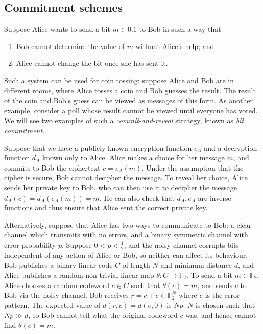 \subsection{Commitment schemes}
Suppose Alice wants to send a bit \( m \in \qty{0,1} \) to Bob in such a way that
\begin{enumerate}
    \item Bob cannot determine the value of \( m \) without Alice's help; and
    \item Alice cannot change the bit once she has sent it.
\end{enumerate}
Such a system can be used for coin tossing: suppose Alice and Bob are in different rooms, where Alice tosses a coin and Bob guesses the result.
The result of the coin and Bob's guess can be viewed as messages of this form.
As another example, consider a poll whose result cannot be viewed until everyone has voted.
We will see two examples of such a \emph{commit-and-reveal} strategy, known as \emph{bit commitment}.

Suppose that we have a publicly known encryption function \( e_A \) and a decryption function \( d_A \) known only to Alice.
Alice makes a choice for her message \( m \), and commits to Bob the ciphertext \( c = e_A(m) \).
Under the assumption that the cipher is secure, Bob cannot decipher the message.
To reveal her choice, Alice sends her private key to Bob, who can then use it to decipher the message \( d_A(c) = d_A(e_A(m)) = m \).
He can also check that \( d_A, e_A \) are inverse functions and thus ensure that Alice sent the correct private key.

Alternatively, suppose that Alice has two ways to communicate to Bob: a clear channel which transmits with no errors, and a binary symmetric channel with error probability \( p \).
Suppose \( 0 < p < \frac{1}{2} \), and the noisy channel corrupts bits independent of any action of Alice or Bob, so neither can affect its behaviour.
Bob publishes a binary linear code \( C \) of length \( N \) and minimum distance \( d \), and Alice publishes a random non-trivial linear map \( \theta \colon C \to \mathbb F_2 \).
To send a bit \( m \in \mathbb F_2 \), Alice chooses a random codeword \( c \in C \) such that \( \theta(c) = m \), and sends \( c \) to Bob via the noisy channel.
Bob receives \( r = c + e \in \mathbb F_2^N \) where \( e \) is the error pattern.
The expected value of \( d(r,c) = d(e,0) \) is \( Np \).
\( N \) is chosen such that \( Np \gg d \), so Bob cannot tell what the original codeword \( c \) was, and hence cannot find \( \theta(c) = m \).

